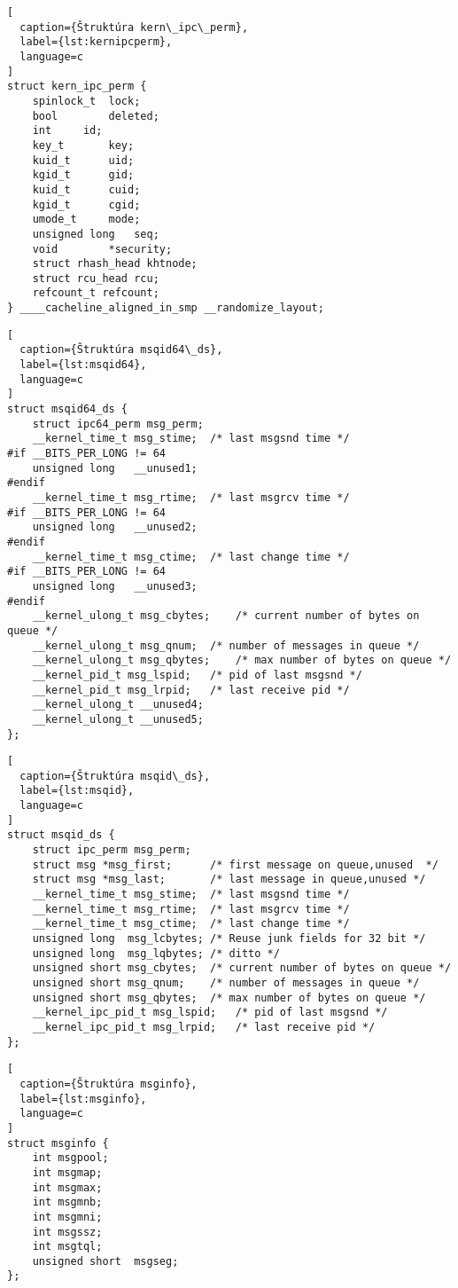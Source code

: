 \begin{lstlisting}[
  caption={Štruktúra kern\_ipc\_perm},
  label={lst:kernipcperm},
  language=c
]
struct kern_ipc_perm {
	spinlock_t	lock;
	bool		deleted;
	int		id;
	key_t		key;
	kuid_t		uid;
	kgid_t		gid;
	kuid_t		cuid;
	kgid_t		cgid;
	umode_t		mode;
	unsigned long	seq;
	void		*security;
	struct rhash_head khtnode;
	struct rcu_head rcu;
	refcount_t refcount;
} ____cacheline_aligned_in_smp __randomize_layout;
\end{lstlisting}
\begin{lstlisting}[
  caption={Štruktúra msqid64\_ds},
  label={lst:msqid64},
  language=c
]
struct msqid64_ds {
	struct ipc64_perm msg_perm;
	__kernel_time_t msg_stime;	/* last msgsnd time */
#if __BITS_PER_LONG != 64
	unsigned long	__unused1;
#endif
	__kernel_time_t msg_rtime;	/* last msgrcv time */
#if __BITS_PER_LONG != 64
	unsigned long	__unused2;
#endif
	__kernel_time_t msg_ctime;	/* last change time */
#if __BITS_PER_LONG != 64
	unsigned long	__unused3;
#endif
	__kernel_ulong_t msg_cbytes;	/* current number of bytes on queue */
	__kernel_ulong_t msg_qnum;	/* number of messages in queue */
	__kernel_ulong_t msg_qbytes;	/* max number of bytes on queue */
	__kernel_pid_t msg_lspid;	/* pid of last msgsnd */
	__kernel_pid_t msg_lrpid;	/* last receive pid */
	__kernel_ulong_t __unused4;
	__kernel_ulong_t __unused5;
};
\end{lstlisting}
\begin{lstlisting}[
  caption={Štruktúra msqid\_ds},
  label={lst:msqid},
  language=c
]
struct msqid_ds {
	struct ipc_perm msg_perm;
	struct msg *msg_first;		/* first message on queue,unused  */
	struct msg *msg_last;		/* last message in queue,unused */
	__kernel_time_t msg_stime;	/* last msgsnd time */
	__kernel_time_t msg_rtime;	/* last msgrcv time */
	__kernel_time_t msg_ctime;	/* last change time */
	unsigned long  msg_lcbytes;	/* Reuse junk fields for 32 bit */
	unsigned long  msg_lqbytes;	/* ditto */
	unsigned short msg_cbytes;	/* current number of bytes on queue */
	unsigned short msg_qnum;	/* number of messages in queue */
	unsigned short msg_qbytes;	/* max number of bytes on queue */
	__kernel_ipc_pid_t msg_lspid;	/* pid of last msgsnd */
	__kernel_ipc_pid_t msg_lrpid;	/* last receive pid */
};
\end{lstlisting}
\begin{lstlisting}[
  caption={Štruktúra msginfo},
  label={lst:msginfo},
  language=c
]
struct msginfo {
	int msgpool;
	int msgmap; 
	int msgmax; 
	int msgmnb; 
	int msgmni; 
	int msgssz; 
	int msgtql; 
	unsigned short  msgseg; 
};
\end{lstlisting}
